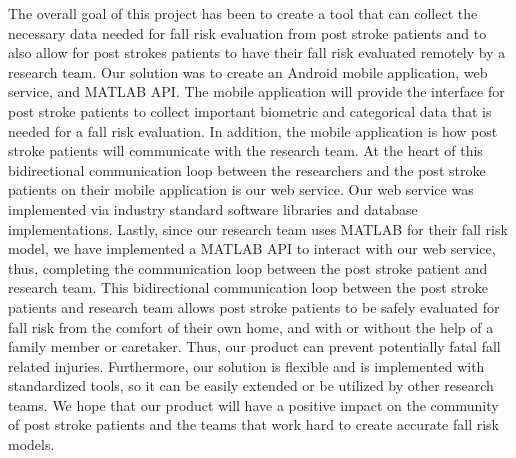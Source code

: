 \documentclass[conference]{IEEEtran}
\begin{document}
The overall goal of this project has been to create a tool that can collect the necessary data needed for fall risk evaluation from post stroke patients and to also allow for post strokes patients to have their fall risk evaluated remotely by a research team. Our solution was to create an Android mobile application, web service, and MATLAB API. The mobile application will provide the interface for post stroke patients to collect important biometric and categorical data that is needed for a fall risk evaluation. In addition, the mobile application is how post stroke patients will communicate with the research team. At the heart of this bidirectional communication loop between the researchers and the post stroke patients on their mobile application is our web service. Our web service was implemented via industry standard software libraries and database implementations. Lastly, since our research team uses MATLAB for their fall risk model, we have implemented a MATLAB API to interact with our web service, thus, completing the communication loop between the post stroke patient and research team. This bidirectional communication loop between the post stroke patients and research team allows post stroke patients to be safely evaluated for fall risk from the comfort of their own home, and with or without the help of a family member or caretaker. Thus, our product can prevent potentially fatal fall related injuries. Furthermore, our solution is flexible and is implemented with standardized tools, so it can be easily extended or be utilized by other research teams. We hope that our product will have a positive impact on the community of post stroke patients and the teams that work hard to create accurate fall risk models.



\end{document}

